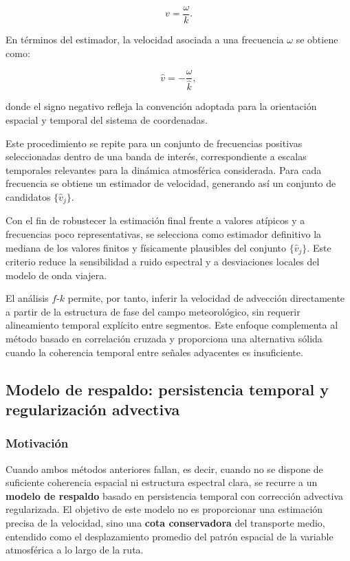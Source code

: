 \documentclass[
  spanish,
  us-letterpaper,
]{scrreprt}
\numberwithin{equation}{section}
\begin{document}
\[
v = \frac{\omega}{k}.
\]

En términos del estimador, la velocidad asociada a una frecuencia
\(\omega\) se obtiene como:

\[
\hat{v} = -\frac{\omega}{\hat{k}},
\]

donde el signo negativo refleja la convención adoptada para la
orientación espacial y temporal del sistema de coordenadas.

Este procedimiento se repite para un conjunto de frecuencias positivas
seleccionadas dentro de una banda de interés, correspondiente a escalas
temporales relevantes para la dinámica atmosférica considerada. Para
cada frecuencia se obtiene un estimador de velocidad, generando así un
conjunto de candidatos \(\{\hat{v}_j\}\).

Con el fin de robustecer la estimación final frente a valores atípicos y
a frecuencias poco representativas, se selecciona como estimador
definitivo la mediana de los valores finitos y físicamente plausibles
del conjunto \(\{\hat{v}_j\}\). Este criterio reduce la sensibilidad a
ruido espectral y a desviaciones locales del modelo de onda viajera.

El análisis \(f\)-\(k\) permite, por tanto, inferir la velocidad de
advección directamente a partir de la estructura de fase del campo
meteorológico, sin requerir alineamiento temporal explícito entre
segmentos. Este enfoque complementa al método basado en correlación
cruzada y proporciona una alternativa sólida cuando la coherencia
temporal entre señales adyacentes es insuficiente.

\subsection{Modelo de respaldo: persistencia temporal y regularización
advectiva}\label{modelo-de-respaldo-persistencia-temporal-y-regularizaciuxf3n-advectiva}

\subsubsection{Motivación}\label{motivaciuxf3n}

Cuando ambos métodos anteriores fallan, es decir, cuando no se dispone
de suficiente coherencia espacial ni estructura espectral clara, se
recurre a un \textbf{modelo de respaldo} basado en persistencia temporal
con corrección advectiva regularizada. El objetivo de este modelo no es
proporcionar una estimación precisa de la velocidad, sino una
\textbf{cota conservadora} del transporte medio, entendido como el
desplazamiento promedio del patrón espacial de la variable atmosférica a
lo largo de la ruta.
\end{document}

